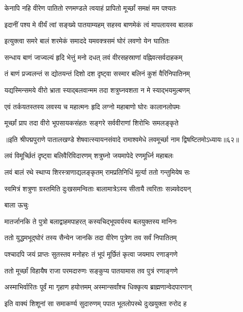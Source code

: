\twolineshloka
{केनापि नहि वीरेण पातितो रणमण्डले}
{त्वयाहं प्रापितो मूर्च्छां समक्षं मम पश्यतः}%

\twolineshloka
{इदानीं पश्य मे वीर्यं त्वां सङ्ख्ये पातयाम्यहम्}
{सहस्व बाणमेकं त्वं मापलायस्व बालक}%

\twolineshloka
{इत्युक्त्वा समरे बालं शरमेकं समाददे}
{यमवक्त्रसमं घोरं लवणो येन घातितः}%

\twolineshloka
{सन्धाय बाणं जाज्वल्यं हृदि भेत्तुं मनो दधत्}
{लवं वीरसहस्राणां वह्निवत्सर्वदाहकम्}%

\twolineshloka
{तं बाणं प्रज्वलन्तं स द्योतयन्तं दिशो दश}
{दृष्ट्वा सस्मार बलिनं कुशं वैरिनिपातिनम्}%

\twolineshloka
{यद्यस्मिन्समये वीरो भ्राता स्याद्बलवान्मम}
{तदा शत्रुघ्नवशता न मे स्याद्भयमुल्बणम्}%

\twolineshloka
{एवं तर्कयतस्तस्य लवस्य च महात्मनः}
{हृदि लग्नो महाबाणो घोरः कालानलोपमः}%

\twolineshloka
{मूर्च्छां प्राप तदा वीरो भूपसायकसंहतः}
{सङ्गरे सर्ववीराणां शिरोभिः समलङ्कृते}%

॥इति श्रीपद्मपुराणे पातालखण्डे शेषवात्स्यायनसंवादे रामाश्वमेधे लवमूर्च्छा नाम द्विषष्टितमोऽध्यायः॥६२॥



\twolineshloka
{लवं विमूर्च्छितं दृष्ट्वा बलिवैरिविदारणम्}
{शत्रुघ्नो जयमापेदे रणमूर्ध्नि महाबलः}%

\twolineshloka
{लवं बालं रथे स्थाप्य शिरस्त्राणाद्यलङ्कृतम्}
{रामप्रतिनिधिं मूर्त्या ततो गन्तुमियेष सः}%

\twolineshloka
{स्वमित्रं शत्रुणा ग्रस्तमिति दुःखसमन्विताः}
{बालामात्रेऽस्य सीतायै त्वरिताः सन्न्यवेदयन्}%

बाला ऊचुः

\twolineshloka
{मातर्जानकि ते पुत्रो बलाद्वाहमपाहरत्}
{कस्यचिद्भूपवर्यस्य बलयुक्तस्य मानिनः}%

\twolineshloka
{ततो युद्धमभूद्घोरं तस्य सैन्येन जानकि}
{तदा वीरेण पुत्रेण तव सर्वं निपातितम्}%

\twolineshloka
{पश्चादपि जयं प्राप्तः सुतस्तव मनोहरः}
{तं भूपं मूर्छितं कृत्वा जयमाप रणाङ्गणे}%

\twolineshloka
{ततो मूर्च्छां विहायैष राजा परमदारुणः}
{सङ्कुप्य पातयामास तव पुत्रं रणाङ्गणे}%

\twolineshloka
{अस्माभिर्वारितः पूर्वं मा गृहाण हयोत्तमम्}
{अस्मान्सर्वांश्च धिक्कृत्य ब्राह्मणान्वेदपारगान्}%

\twolineshloka
{इति वाक्यं शिशूनां सा समाकर्ण्य सुदारुणम्}
{पपात भूतलोपस्थे दुःखयुक्ता रुरोद ह}%

